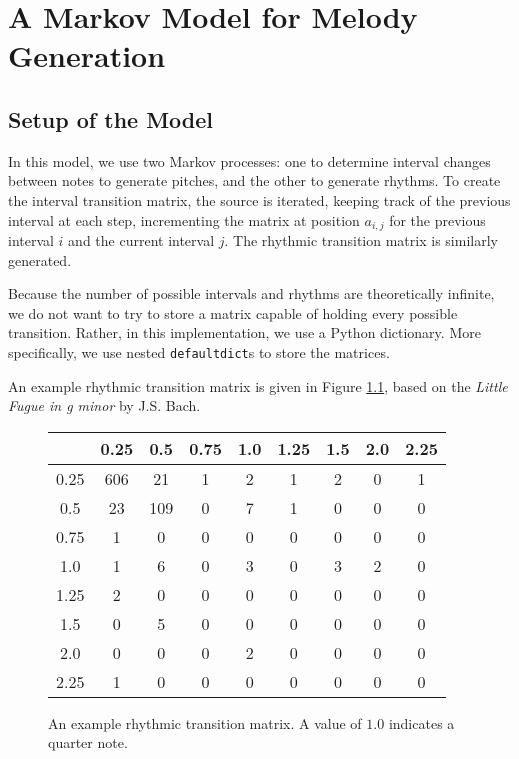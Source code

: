 \chapter{A Markov Model for Melody Generation} \label{melody:markov}

\section{Setup of the Model}

In this model, we use two Markov processes: one to determine interval changes between notes to generate pitches, and the other to generate rhythms.
To create the interval transition matrix, the source is iterated, keeping track of the previous interval at each step, incrementing the matrix at position $a_{i,j}$ for the previous interval $i$ and the current interval $j$.
The rhythmic transition matrix is similarly generated.

Because the number of possible intervals and rhythms are theoretically infinite, we do not want to try to store a matrix capable of holding every possible transition.
Rather, in this implementation, we use a Python dictionary.
More specifically, we use nested \lstinline[columns=fixed]{defaultdict}s to store the matrices.

An example rhythmic transition matrix is given in Figure \ref{fig:rhythmTransitionMatrix}, based on the \textit{Little Fugue in g minor} by J.S. Bach.

\begin{figure}
	\centering
	\begin{tabular}{c | c c c c c c c c}
		& 0.25 & 0.5 & 0.75 & 1.0 & 1.25 & 1.5 & 2.0 & 2.25\\
		\hline
		0.25 & 606 & 21 & 1 & 2 & 1 & 2 & 0 & 1\\
		0.5 & 23 & 109 & 0 & 7 & 1 & 0 & 0 & 0\\
		0.75 & 1 & 0 & 0 & 0 & 0 & 0 & 0 & 0\\
		1.0 & 1 & 6 & 0 & 3 & 0 & 3 & 2 & 0\\
		1.25 & 2 & 0 & 0 & 0 & 0 & 0 & 0 & 0\\
		1.5 & 0 & 5 & 0 & 0 & 0 & 0 & 0 & 0\\
		2.0 & 0 & 0 & 0 & 2 & 0 & 0 & 0 & 0\\
		2.25 & 1 & 0 & 0 & 0 & 0 & 0 & 0 & 0
	\end{tabular}
	\caption{An example rhythmic transition matrix. A value of $1.0$ indicates a quarter note.}
	\label{fig:rhythmTransitionMatrix}
\end{figure}

